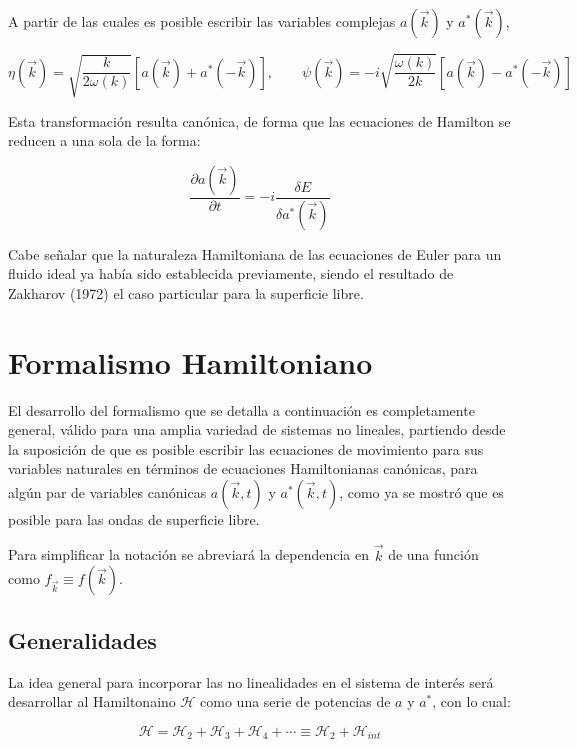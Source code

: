 A partir de las cuales es posible escribir las variables complejas $a(\vec k)$ y $a^*(\vec k)$, 

\begin{equation}
	\eta(\vec k) = \sqrt{\frac{k}{2\omega(k)}}\left[a(\vec k)+a^*(-\vec k) \right], \qquad \psi(\vec k) = -i\sqrt{\frac{\omega(k)}{2k}} \left[a(\vec k)-a^*(-\vec k)  \right]
\end{equation} 

Esta transformación resulta canónica, de forma que las ecuaciones de Hamilton se reducen a una sola de la forma: 

\begin{equation}
	\frac{\partial a(\vec k)}{\partial t}=-i\frac{\delta E}{\delta a^*(\vec k)} %
\end{equation} 

Cabe señalar que la naturaleza Hamiltoniana de las ecuaciones de Euler para un fluido ideal ya había sido establecida previamente, siendo el resultado de Zakharov (1972) el caso particular para la superficie libre.  \cite{salmon1988hamiltonian} %

\section{Formalismo Hamiltoniano}  %
\label{sec:formalismo_hamiltoniano} 
El desarrollo del formalismo que se detalla a continuación es completamente general, válido para una amplia variedad de sistemas no lineales, partiendo desde la suposición de que es posible escribir las ecuaciones de movimiento para sus variables naturales en términos de ecuaciones Hamiltonianas canónicas, para algún par de variables canónicas $a(\vec k, t)$ y $a^*(\vec k, t)$, como ya se mostró que es posible para las ondas de superficie libre. 

Para simplificar la notación se abreviará la dependencia en $\vec k$ de una función como $f_{\vec k}\equiv f(\vec k)$. 

\subsection{Generalidades} 
La idea general para incorporar las no linealidades en el sistema de interés será desarrollar al Hamiltonaino $\mathcal{H}$ como una serie de potencias de $a$ y $a^*$, con lo cual: 

\begin{equation}
	\mathcal{H} = \mathcal{H}_2 + \mathcal{H}_3 + \mathcal{H}_4 + \cdots \equiv \mathcal{H}_2 + \mathcal{H}_{int} 
\end{equation}

